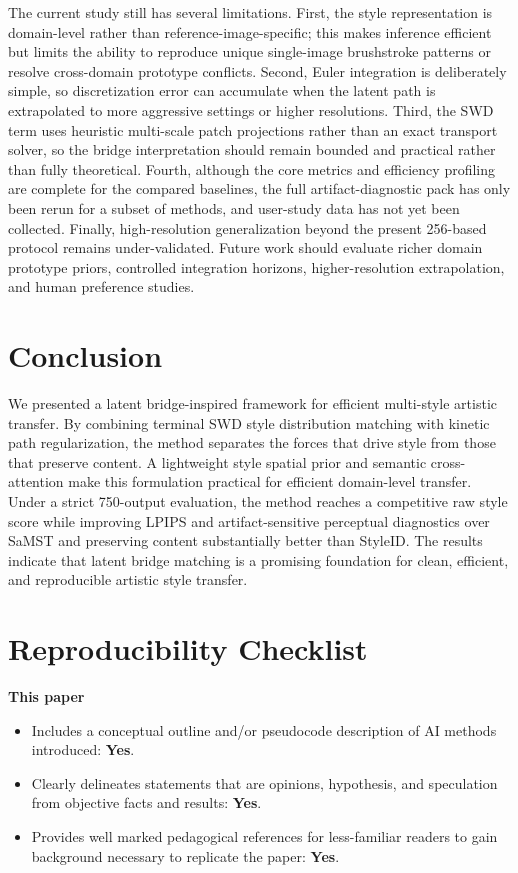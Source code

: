 ﻿\documentclass[letterpaper]{article}
\begin{document}
The current study still has several limitations. First, the style representation is domain-level rather than reference-image-specific; this makes inference efficient but limits the ability to reproduce unique single-image brushstroke patterns or resolve cross-domain prototype conflicts. Second, Euler integration is deliberately simple, so discretization error can accumulate when the latent path is extrapolated to more aggressive settings or higher resolutions. Third, the SWD term uses heuristic multi-scale patch projections rather than an exact transport solver, so the bridge interpretation should remain bounded and practical rather than fully theoretical. Fourth, although the core metrics and efficiency profiling are complete for the compared baselines, the full artifact-diagnostic pack has only been rerun for a subset of methods, and user-study data has not yet been collected. Finally, high-resolution generalization beyond the present 256-based protocol remains under-validated. Future work should evaluate richer domain prototype priors, controlled integration horizons, higher-resolution extrapolation, and human preference studies.

\section{Conclusion}
We presented a latent bridge-inspired framework for efficient multi-style artistic transfer. By combining terminal SWD style distribution matching with kinetic path regularization, the method separates the forces that drive style from those that preserve content. A lightweight style spatial prior and semantic cross-attention make this formulation practical for efficient domain-level transfer. Under a strict 750-output evaluation, the method reaches a competitive raw style score while improving LPIPS and artifact-sensitive perceptual diagnostics over SaMST and preserving content substantially better than StyleID. The results indicate that latent bridge matching is a promising foundation for clean, efficient, and reproducible artistic style transfer.



\clearpage
\small
\setlength{\itemsep}{1pt}
\setlength{\parskip}{2pt}
\section*{Reproducibility Checklist}
\noindent\textbf{This paper}
\begin{itemize}
\item Includes a conceptual outline and/or pseudocode description of AI methods introduced: \textbf{Yes}.
\item Clearly delineates statements that are opinions, hypothesis, and speculation from objective facts and results: \textbf{Yes}.
\item Provides well marked pedagogical references for less-familiar readers to gain background necessary to replicate the paper: \textbf{Yes}.
\end{itemize}
\end{document}
